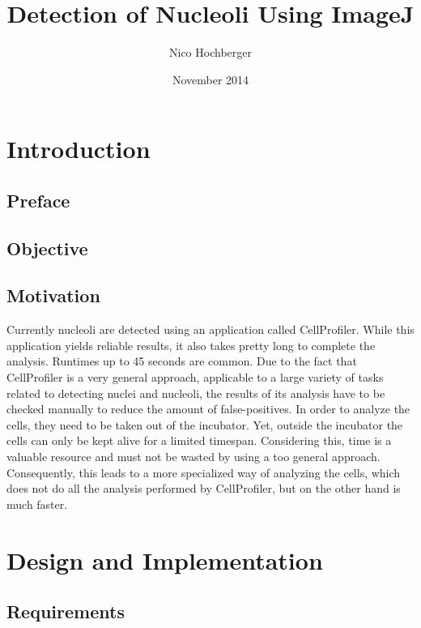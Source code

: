 \documentclass[a4paper, 11pt]{article}
\begin{document}


\title{Detection of Nucleoli Using ImageJ}
\author{Nico Hochberger}
\date{November 2014}
\maketitle

\newpage
\tableofcontents

\newpage
\section{Introduction}

\subsection{Preface}
 
\subsection{Objective}

\subsection{Motivation}
Currently nucleoli are detected using an application called CellProfiler. While
this application yields reliable results, it also takes pretty long to complete
the analysis. Runtimes up to 45 seconds are common.
Due to the fact that CellProfiler is a very general approach, applicable to a
large variety of tasks related to detecting nuclei and nucleoli, the results of
its analysis have to be checked manually to reduce the amount of
false-positives.
In order to analyze the cells, they need to be taken out of the incubator. Yet,
outside the incubator the cells can only be kept alive for a limited timespan.
Considering this, time is a valuable resource and must not be wasted by using a
too general approach.
Consequently, this leads to a more specialized way of analyzing the cells, which
does not do all the analysis performed by CellProfiler, but on the other hand is
much faster.

\newpage
\section{Design and Implementation}

\subsection{Requirements}
\end{document}
